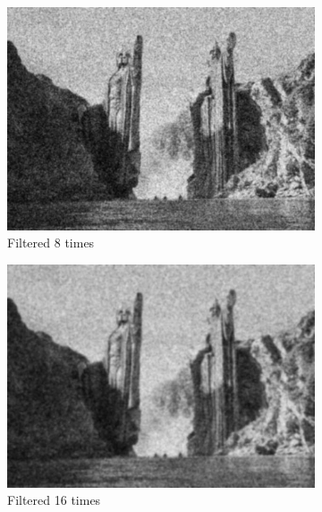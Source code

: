 \documentclass[paper=a4, fontsize=11pt]{scrartcl} %
\numberwithin{equation}{section} %
\numberwithin{figure}{section} %
\numberwithin{table}{section} %
\begin{document}
\vspace{-2mm}
\begin{figure}[H]
	\caption{Denoised image after filtering multiple time ($\sigma = 0.5$) \label{fig:gf}}
	\centering
	\begin{subfigure}[b]{0.45\textwidth}
		\includegraphics[width=\textwidth]{gf_8.jpg}
		\caption{Filtered 8 times}
	\end{subfigure}
	\hspace{5mm}
	\vspace{5mm}
	\begin{subfigure}[b]{0.45\textwidth}
		\includegraphics[width=\textwidth]{gf_16.jpg}
		\caption{Filtered 16 times}
	\end{subfigure}
	\begin{subfigure}[b]{0.45\textwidth}

\end{subfigure}
\end{figure}
\end{document}
